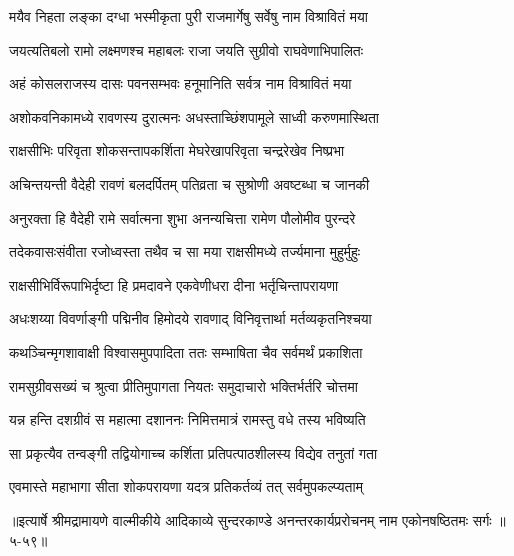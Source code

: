 \twolineshloka
{मयैव निहता लङ्का दग्धा भस्मीकृता पुरी}
{राजमार्गेषु सर्वेषु नाम विश्रावितं मया} %

\twolineshloka
{जयत्यतिबलो रामो लक्ष्मणश्च महाबलः}
{राजा जयति सुग्रीवो राघवेणाभिपालितः} %

\twolineshloka
{अहं कोसलराजस्य दासः पवनसम्भवः}
{हनूमानिति सर्वत्र नाम विश्रावितं मया} %

\twolineshloka
{अशोकवनिकामध्ये रावणस्य दुरात्मनः}
{अधस्ताच्छिंशपामूले साध्वी करुणमास्थिता} %

\twolineshloka
{राक्षसीभिः परिवृता शोकसन्तापकर्शिता}
{मेघरेखापरिवृता चन्द्ररेखेव निष्प्रभा} %

\twolineshloka
{अचिन्तयन्ती वैदेही रावणं बलदर्पितम्}
{पतिव्रता च सुश्रोणी अवष्टब्धा च जानकी} %

\twolineshloka
{अनुरक्ता हि वैदेही रामे सर्वात्मना शुभा}
{अनन्यचित्ता रामेण पौलोमीव पुरन्दरे} %

\twolineshloka
{तदेकवासःसंवीता रजोध्वस्ता तथैव च}
{सा मया राक्षसीमध्ये तर्ज्यमाना मुहुर्मुहुः} %

\twolineshloka
{राक्षसीभिर्विरूपाभिर्दृष्टा हि प्रमदावने}
{एकवेणीधरा दीना भर्तृचिन्तापरायणा} %

\twolineshloka
{अधःशय्या विवर्णाङ्गी पद्मिनीव हिमोदये}
{रावणाद् विनिवृत्तार्था मर्तव्यकृतनिश्चया} %

\twolineshloka
{कथञ्चिन्मृगशावाक्षी विश्वासमुपपादिता}
{ततः सम्भाषिता चैव सर्वमर्थं प्रकाशिता} %

\twolineshloka
{रामसुग्रीवसख्यं च श्रुत्वा प्रीतिमुपागता}
{नियतः समुदाचारो भक्तिर्भर्तरि चोत्तमा} %

\twolineshloka
{यन्न हन्ति दशग्रीवं स महात्मा दशाननः}
{निमित्तमात्रं रामस्तु वधे तस्य भविष्यति} %

\twolineshloka
{सा प्रकृत्यैव तन्वङ्गी तद्वियोगाच्च कर्शिता}
{प्रतिपत्पाठशीलस्य विद्येव तनुतां गता} %

\twolineshloka
{एवमास्ते महाभागा सीता शोकपरायणा}
{यदत्र प्रतिकर्तव्यं तत् सर्वमुपकल्प्यताम्} %


॥इत्यार्षे श्रीमद्रामायणे वाल्मीकीये आदिकाव्ये सुन्दरकाण्डे अनन्तरकार्यप्ररोचनम् नाम एकोनषष्ठितमः सर्गः ॥५-५९॥
